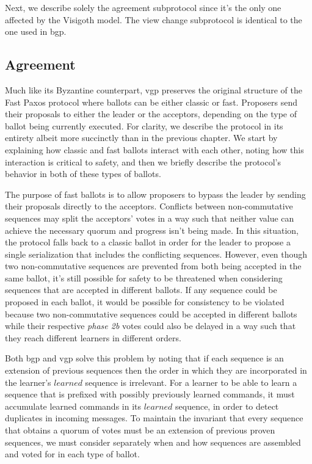 Next, we describe solely the agreement subprotocol since it's the only one affected by the Visigoth model. The view change subprotocol is identical to the one used in \acrlong{bgp}.

\subsection{Agreement}

Much like its Byzantine counterpart, \acrshort{vgp} preserves the original structure of the Fast Paxos protocol where ballots can be either classic or fast. Proposers send their proposals to either the leader or the acceptors, depending on the type of ballot being currently executed. For clarity, we describe the protocol in its entirety albeit more succinctly than in the previous chapter. We start by explaining how classic and fast ballots interact with each other, noting how this interaction is critical to safety, and then we briefly describe the protocol's behavior in both of these types of ballots. \par
The purpose of fast ballots is to allow proposers to bypass the leader by sending their proposals directly to the acceptors. Conflicts between non-commutative sequences may split the acceptors' votes in a way such that neither value can achieve the necessary quorum and progress isn't being made. In this situation, the protocol falls back to a classic ballot in order for the leader to propose a single serialization that includes the conflicting sequences. However, even though two non-commutative sequences are prevented from both being accepted in the same ballot, it's still possible for safety to be threatened when considering sequences that are accepted in different ballots. If any sequence could be proposed in each ballot, it would be possible for consistency to be violated because two non-commutative sequences could be accepted in different ballots while their respective \textit{phase 2b} votes could also be delayed in a way such that they reach different learners in different orders.\par
Both \acrshort{bgp} and \acrshort{vgp} solve this problem by noting that if each sequence is an extension of previous sequences then the order in which they are incorporated in the learner's $learned$ sequence is irrelevant. For a learner to be able to learn a sequence that is prefixed with possibly previously learned commands, it must accumulate learned commands in its $learned$ sequence, in order to detect duplicates in incoming messages. To maintain the invariant that every sequence that obtains a quorum of votes must be an extension of previous proven sequences, we must consider separately when and how sequences are assembled and voted for in each type of ballot. \par 
